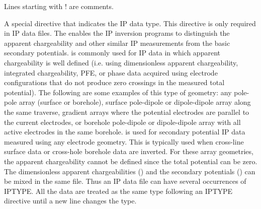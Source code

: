\begin{description}[leftmargin=5cm, style=sameline, align=left]
\item[\codeName{!}] Lines starting with ! are comments.
\item[\codeName{IPTYPE}] A special directive that indicates the IP data type. This directive is only required in IP data files. The  enables the IP inversion programs to distinguish the apparent chargeability and other similar IP measurements from the basic secondary potentials.  is commonly used for IP data in which apparent chargeability is well defined (i.e. using dimensionless apparent chargeability, integrated chargeability, PFE, or phase data acquired using electrode configurations that do not produce zero crossings in the measured total potential). The following are some examples of this type of geometry: any pole-pole array (surface or borehole), surface pole-dipole or dipole-dipole array along the same traverse, gradient arrays where the potential electrodes are parallel to the current electrodes, or borehole pole-dipole or dipole-dipole array with all active electrodes in the same borehole.  is used for secondary potential IP data measured using any electrode geometry. This is typically used when cross-line surface data or cross-hole borehole data are inverted. For these array geometries, the apparent chargeability cannot be defined since the total potential can be zero. The dimensionless apparent chargeabilities () and the secondary potentials () can be mixed in the same file. Thus an IP data file can have several occurrences of IPTYPE. All the data are treated as the same type following an IPTYPE directive until a new line changes the type.

\end{description}
